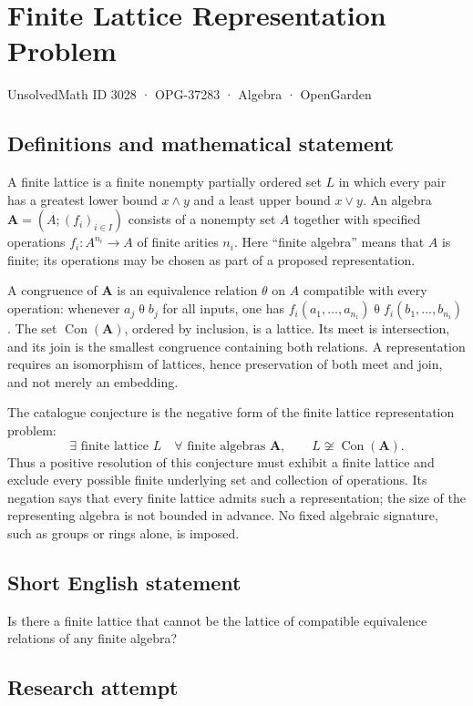 \documentclass[11pt,a4paper]{article}
\begin{document}
\section*{Finite Lattice Representation Problem}\label{3028}
{\small UnsolvedMath ID 3028 · OPG-37283 · Algebra · OpenGarden}
\subsection{Definitions and mathematical statement}
A finite lattice is a finite nonempty partially ordered set $L$ in which every
pair has a greatest lower bound $x\wedge y$ and a least upper bound $x\vee y$.
An algebra $\mathbf A=(A;(f_i)_{i\in I})$ consists of a nonempty set $A$ together
with specified operations $f_i:A^{n_i}\to A$ of finite arities $n_i$.
Here ``finite algebra'' means that $A$ is finite; its operations may be chosen
as part of a proposed representation.

A congruence of $\mathbf A$ is an equivalence relation $\theta$ on $A$ compatible
with every operation: whenever $a_j\mathrel\theta b_j$ for all inputs, one has
$f_i(a_1,\ldots,a_{n_i})\mathrel\theta f_i(b_1,\ldots,b_{n_i})$.
The set $\operatorname{Con}(\mathbf A)$, ordered by inclusion, is a lattice.
Its meet is intersection, and its join is the smallest congruence containing
both relations. A representation requires an isomorphism of lattices, hence
preservation of both meet and join, and not merely an embedding.

The catalogue conjecture is the negative form of the finite lattice
representation problem:
\[
 \exists\text{ finite lattice }L\quad
 \forall\text{ finite algebras }\mathbf A,\qquad
 L\not\cong\operatorname{Con}(\mathbf A).
\]
Thus a positive resolution of this conjecture must exhibit a finite lattice
and exclude every possible finite underlying set and collection of operations.
Its negation says that every finite lattice admits such a representation;
the size of the representing algebra is not bounded in advance. No fixed
algebraic signature, such as groups or rings alone, is imposed.
\subsection{Short English statement}
Is there a finite lattice that cannot be the lattice of compatible equivalence relations of any finite algebra?
\subsection{Research attempt}
\end{document}
